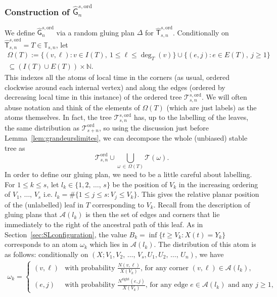 \documentclass[AHL,Unicode,longabstracts,published]{cedram}
\renewcommand{\subset}{\subseteq}
\newcommand{\ord}{\mathrm{ord}}
\newcommand{\Rightll}{\mathrm{right}}
\newcommand{\cT}{\mathcal{T}}
\newcommand{\cA}{\mathcal{A}}
\newcommand{\sG}{\mathsf{G}}
\newcommand{\sT}{\mathsf{T}}
\newcommand{\A}{\mathbb{T}}
\newcommand{\N}{\mathbb{N}}
\begin{document}
\subsubsection{Construction of $\widehat{\sG}_n^{s,\ord}$}
We define $\widehat{\sG}_n^{s,\ord}$ via a random gluing plan $\Delta$ for $\widehat{\sT}_{s,n}^{s,\ord}$. Conditionally on $\widehat{\sT}^{s,\ord}_{s,n}=T\in \A_{s,n}$, let
\begin{multline*}
\Omega(T):=\big\{(v,\ell): v\in I(T),\ 1 \leq \ell \leq \deg_T(v)\big\} \cup \big\{(e,j) : e\in E(T),\ j \geq 1\big\}\\
\subset(I(T) \cup E(T)) \times\N.
\end{multline*}
This indexes all the atoms of local time in the corners (as usual, ordered clockwise around each internal vertex) and along the edges (ordered by decreasing local time in this instance) of the ordered tree $\cT_{s,n}^{s,\ord}$. We will often abuse notation and think of the elements of $\Omega(T)$ (which are just labels) as the atoms themselves. In fact, the tree $\cT_{s,n}^{s,\ord}$ has, up to the labelling of the leaves, the same distribution as $\cT_{s+n}^{\ord}$, so using the discussion just before Lemma~\ref{lem:grandeurslimites}, we can decompose the whole (unbiased) stable tree as
\[
\cT_{s,n}^{\ord}\cup \bigcup_{\omega\,\in\,\Omega(T)}\cT(\omega).
\]
In order to define our gluing plan, we need to be a little careful about labelling. For $1 \le k \le s$, let $l_k \in \{1,2,\,\ldots,\,s\}$ be the position of $V_k$ in the increasing ordering of $V_1,\,\ldots,\, V_s$ i.e. $l_k = \#\{1 \le j \le s: V_j \le V_k\}$. This gives the relative planar position of the (unlabelled) leaf in $T$ corresponding to $V_k$. Recall from the description of gluing plans that $\cA(l_k)$ is then the set of edges and corners that lie immediately to the right of the ancestral path of this leaf. As in Section~\ref{sec:SLconfiguration}, the value $B_k = \inf \{t \ge V_{k}: X(t) = Y_{k}\}$ corresponds to an atom $\omega_k$ which lies in $\cA(l_k)$. The distribution of this atom is as follows: conditionally on $(X;V_1,V_2,\,\dots,\, V_s,U_1,U_2,\,\dots,\,U_n)$, we have
\begin{align*}
\omega_k =
\begin{cases}
(v,\ell) & \text{with probability $\frac{N(v,\ell)}{X(V_k)}$, for any corner $(v,\ell) \in \cA(l_k)$},\\
(e,j) & \text{with probability $\frac{N^{\Rightll}(e,j)}{X(V_k)}$, for any edge $e \in \cA(l_k)$ and any $j \ge 1$,}
\end{cases}
\end{align*}
\end{document}
